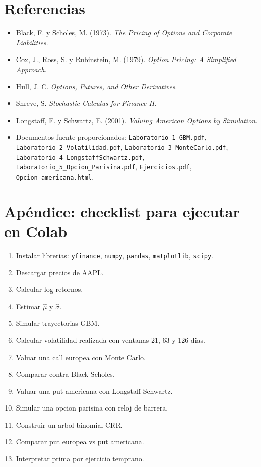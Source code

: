 \documentclass[12pt,a4paper]{article}
\begin{document}
\section{Referencias}

\begin{itemize}
    \item Black, F. y Scholes, M. (1973). \textit{The Pricing of Options and Corporate Liabilities}.
    \item Cox, J., Ross, S. y Rubinstein, M. (1979). \textit{Option Pricing: A Simplified Approach}.
    \item Hull, J. C. \textit{Options, Futures, and Other Derivatives}.
    \item Shreve, S. \textit{Stochastic Calculus for Finance II}.
    \item Longstaff, F. y Schwartz, E. (2001). \textit{Valuing American Options by Simulation}.
    \item Documentos fuente proporcionados: \texttt{Laboratorio\_1\_GBM.pdf}, \texttt{Laboratorio\_2\_Volatilidad.pdf}, \texttt{Laboratorio\_3\_MonteCarlo.pdf}, \texttt{Laboratorio\_4\_LongstaffSchwartz.pdf}, \texttt{Laboratorio\_5\_Opcion\_Parisina.pdf}, \texttt{Ejercicios.pdf}, \texttt{Opcion\_americana.html}.
\end{itemize}

\appendix
\section{Apéndice: checklist para ejecutar en Colab}

\begin{enumerate}
    \item Instalar librerias: \texttt{yfinance}, \texttt{numpy}, \texttt{pandas}, \texttt{matplotlib}, \texttt{scipy}.
    \item Descargar precios de AAPL.
    \item Calcular log-retornos.
    \item Estimar \(\hat{\mu}\) y \(\hat{\sigma}\).
    \item Simular trayectorias GBM.
    \item Calcular volatilidad realizada con ventanas 21, 63 y 126 dias.
    \item Valuar una call europea con Monte Carlo.
    \item Comparar contra Black-Scholes.
    \item Valuar una put americana con Longstaff-Schwartz.
    \item Simular una opcion parisina con reloj de barrera.
    \item Construir un arbol binomial CRR.
    \item Comparar put europea vs put americana.
    \item Interpretar prima por ejercicio temprano.
\end{enumerate}
\end{document}

